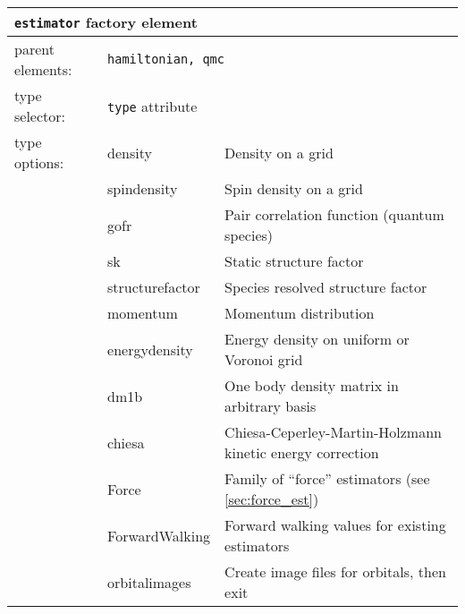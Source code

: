 \FloatBarrier
\begin{table}[h]
\begin{center}
\begin{tabularx}{\textwidth}{l l l l l l }
\hline
\multicolumn{6}{l}{\texttt{estimator} factory element} \\
\hline
\multicolumn{2}{l}{parent elements:} & \multicolumn{4}{l}{\texttt{hamiltonian, qmc}}\\
\multicolumn{2}{l}{type   selector:} & \multicolumn{4}{l}{\texttt{type} attribute}\\
\multicolumn{2}{l}{type   options: } & \multicolumn{2}{l}{density           } & \multicolumn{2}{l}{Density on a grid}\\
\multicolumn{2}{l}{                } & \multicolumn{2}{l}{spindensity       } & \multicolumn{2}{l}{Spin density on a grid}\\
\multicolumn{2}{l}{                } & \multicolumn{2}{l}{gofr              } & \multicolumn{2}{l}{Pair correlation function (quantum species)}\\
\multicolumn{2}{l}{                } & \multicolumn{2}{l}{sk                } & \multicolumn{2}{l}{Static structure factor}\\
\multicolumn{2}{l}{                } & \multicolumn{2}{l}{structurefactor   } & \multicolumn{2}{l}{Species resolved structure factor}\\
\multicolumn{2}{l}{                } & \multicolumn{2}{l}{momentum          } & \multicolumn{2}{l}{Momentum distribution}\\
\multicolumn{2}{l}{                } & \multicolumn{2}{l}{energydensity     } & \multicolumn{2}{l}{Energy density on uniform or Voronoi grid}\\
\multicolumn{2}{l}{                } & \multicolumn{2}{l}{dm1b              } & \multicolumn{2}{l}{One body density matrix in arbitrary basis}\\
\multicolumn{2}{l}{                } & \multicolumn{2}{l}{chiesa            } & \multicolumn{2}{l}{Chiesa-Ceperley-Martin-Holzmann kinetic energy correction}\\
\multicolumn{2}{l}{                } & \multicolumn{2}{l}{Force             } & \multicolumn{2}{l}{Family of ``force'' estimators (see \ref{sec:force_est})}\\
\multicolumn{2}{l}{                } & \multicolumn{2}{l}{ForwardWalking    } & \multicolumn{2}{l}{Forward walking values for existing estimators}\\
\multicolumn{2}{l}{                } & \multicolumn{2}{l}{orbitalimages     } & \multicolumn{2}{l}{Create image files for orbitals, then exit}\\

\end{tabularx}
\end{center}
\end{table}
